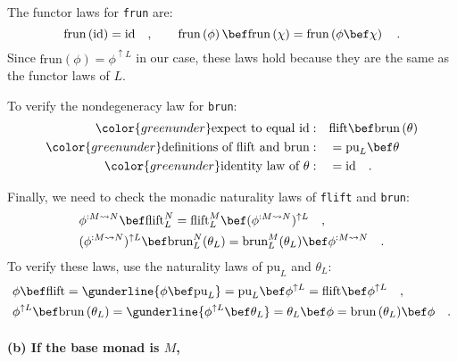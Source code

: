 The functor laws for \lstinline!frun! are:
\[
\text{frun}\left(\text{id}\right)=\text{id}\quad,\quad\quad\text{frun}\left(\phi\right)\bef\text{frun}\left(\chi\right)=\text{frun}\left(\phi\bef\chi\right)\quad.
\]
Since $\text{frun}\left(\phi\right)=\phi^{\uparrow L}$ in our case,
these laws hold because they are the same as the functor laws of $L$.

To verify the nondegeneracy law for \lstinline!brun!:
\begin{align*}
{\color{greenunder}\text{expect to equal }\text{id}:}\quad & \text{flift}\bef\text{brun}\left(\theta\right)\\
{\color{greenunder}\text{definitions of }\text{flift}\text{ and }\text{brun}:}\quad & =\text{pu}_{L}\bef\theta\\
{\color{greenunder}\text{identity law of }\theta:}\quad & =\text{id}\quad.
\end{align*}

Finally, we need to check the monadic naturality laws of \lstinline!flift!
and \lstinline!brun!:
\begin{align*}
 & \phi^{:M\leadsto N}\bef\text{flift}_{L}^{N}=\text{flift}_{L}^{M}\bef(\phi^{:M\leadsto N})^{\uparrow L}\quad,\\
 & (\phi^{:M\leadsto N})^{\uparrow L}\bef\text{brun}_{L}^{N}(\theta_{L})=\text{brun}_{L}^{M}(\theta_{L})\bef\phi^{:M\leadsto N}\quad.
\end{align*}
To verify these laws, use the naturality laws of $\text{pu}_{L}$
and $\theta_{L}$:
\begin{align*}
 & \phi\bef\text{flift}=\gunderline{\phi\bef\text{pu}_{L}}=\text{pu}_{L}\bef\phi^{\uparrow L}=\text{flift}\bef\phi^{\uparrow L}\quad,\\
 & \phi^{\uparrow L}\bef\text{brun}\,(\theta_{L})=\gunderline{\phi^{\uparrow L}\bef\theta_{L}}=\theta_{L}\bef\phi=\text{brun}\,(\theta_{L})\bef\phi\quad.
\end{align*}


\paragraph{(b) If the base monad is $M$, }

